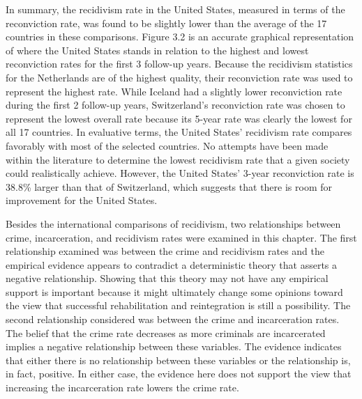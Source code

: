 In summary, the recidivism rate in the United States, measured in terms of the reconviction rate, was found to be slightly lower than the average of the 17 countries in these comparisons.  Figure 3.2 is an accurate graphical representation of where the United States stands in relation to the highest and lowest reconviction rates for the first 3 follow-up years.  Because the recidivism statistics for the Netherlands are of the highest quality, their reconviction rate was used to represent the highest rate.  While Iceland had a slightly lower reconviction rate during the first 2 follow-up years, Switzerland's reconviction rate was chosen to represent the lowest overall rate because its 5-year rate was clearly the lowest for all 17 countries.  In evaluative terms, the United States' recidivism rate compares favorably with most of the selected countries.  No attempts have been made within the literature to determine the lowest recidivism rate that a given society could realistically achieve.  However, the United States' 3-year reconviction rate is 38.8\% larger than that of Switzerland, which suggests that there is room for improvement for the United States.

Besides the international comparisons of recidivism, two relationships between crime, incarceration, and recidivism rates were examined in this chapter.  The first relationship examined was between the crime and recidivism rates and the empirical evidence appears to contradict a deterministic theory that asserts a negative relationship.  Showing that this theory may not have any empirical support is important because it might ultimately change some opinions toward the view that successful rehabilitation and reintegration is still a possibility.  The second relationship considered was between the crime and incarceration rates.  The belief that the crime rate decreases as more criminals are incarcerated implies a negative relationship between these variables.  The evidence indicates that either there is no relationship between these variables or the relationship is, in fact, positive.  In either case, the evidence here does not support the view that increasing the incarceration rate lowers the crime rate.  